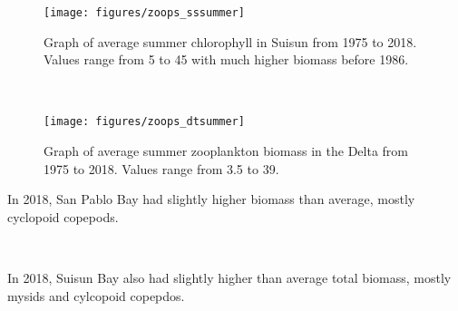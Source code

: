 \documentclass[
]{book}
\begin{document}
\begin{panel-grid}
\begin{columns-nocenter}
\begin{column800}

\begin{expand}

\begin{figure}
\texttt{[image: figures/zoops\_sssummer]} \caption{Graph of average summer chlorophyll in Suisun from 1975 to 2018. Values range from 5 to 45 with much higher biomass before 1986.}\label{fig:unnamed-chunk-71}
\end{figure}

\end{expand}

\end{column800}

\begin{column40}

~

\end{column40}

\begin{column800}

\begin{expand}

\begin{figure}
\texttt{[image: figures/zoops\_dtsummer]} \caption{Graph of average summer zooplankton biomass in the Delta from 1975 to 2018. Values range from 3.5 to 39.}\label{fig:unnamed-chunk-72}
\end{figure}

\end{expand}

\end{column800}

\end{columns-nocenter}

\begin{columns-nocenter}

\begin{column800}

In 2018, San Pablo Bay had slightly higher biomass than average, mostly cyclopoid copepods.

\end{column800}

\begin{column40}

~

\end{column40}

\begin{column800}

In 2018, Suisun Bay also had slightly higher than average total biomass, mostly mysids and cylcopoid copepdos.


\end{column800}
\end{columns-nocenter}
\end{panel-grid}
\end{document}
